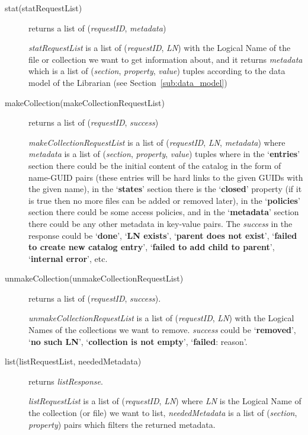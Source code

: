 \documentclass{book}
\begin{document}
\begin{description}
    \item[stat(statRequestList)] returns a list of (\emph{requestID}, \emph{metadata})
    
    \emph{statRequestList} is a list of (\emph{requestID}, \emph{LN}) with the Logical Name of the file or collection we want to get information about, and it returns \emph{metadata} which is a list of (\emph{section}, \emph{property}, \emph{value}) tuples according to the data model of the Librarian (see Section~\ref{sub:data_model})
    
    \item[makeCollection(makeCollectionRequestList)] returns a list of (\emph{requestID}, \emph{success})
    
    \emph{makeCollectionRequestList} is a list of (\emph{requestID}, \emph{LN}, \emph{metadata}) where \emph{metadata} is a list of (\emph{section}, \emph{property}, \emph{value}) tuples where in the `\textbf{entries}' section there could be the initial content of the catalog in the form of name-GUID pairs (these entries will be hard links to the given GUIDs with the given name), in the `\textbf{states}' section there is the `\textbf{closed}' property (if it is true then no more files can be added or removed later), in the `\textbf{policies}' section there could be some access policies, and in the `\textbf{metadata}' section there could be any other metadata in key-value pairs. The \emph{success} in the response could be `\textbf{done}', `\textbf{LN exists}', `\textbf{parent does not exist}', `\textbf{failed to create new catalog entry}', `\textbf{failed to add child to parent}', `\textbf{internal error}', etc.
    \item[unmakeCollection(unmakeCollectionRequestList)] returns a list of (\emph{requestID}, \emph{success}).
    
    \emph{unmakeCollectionRequestList} is a list of (\emph{requestID}, \emph{LN}) with the Logical Names of the collections we want to remove. \emph{success} could be `\textbf{removed}', `\textbf{no such LN}', `\textbf{collection is not empty}', `\textbf{failed}: reason'.
    
    \item[list(listRequestList, neededMetadata)] returns \emph{listResponse}.
    
    \emph{listRequestList} is a list of (\emph{requestID}, \emph{LN}) where \emph{LN} is the Logical Name of the collection (or file) we want to list, \emph{neededMetadata} is a list of (\emph{section}, \emph{property}) pairs which filters the returned metadata.
    

\end{description}
\end{document}

